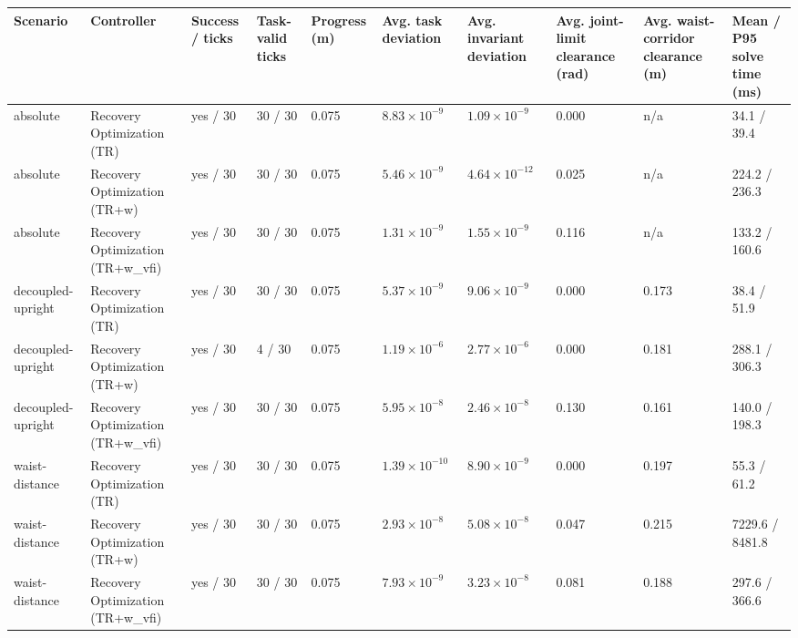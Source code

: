 \begin{tabular}{llllllllll}
\toprule
Scenario & Controller & Success / ticks & Task-valid ticks & Progress (m) & Avg. task deviation & Avg. invariant deviation & Avg. joint-limit clearance (rad) & Avg. waist-corridor clearance (m) & Mean / P95 solve time (ms) \\
\midrule
absolute & Recovery Optimization (TR) & yes / 30 & 30 / 30 & 0.075 & $8.83\times 10^{-9}$ & $1.09\times 10^{-9}$ & 0.000 & n/a & 34.1 / 39.4 \\
absolute & Recovery Optimization (TR+w) & yes / 30 & 30 / 30 & 0.075 & $5.46\times 10^{-9}$ & $4.64\times 10^{-12}$ & 0.025 & n/a & 224.2 / 236.3 \\
absolute & Recovery Optimization (TR+w\_vfi) & yes / 30 & 30 / 30 & 0.075 & $1.31\times 10^{-9}$ & $1.55\times 10^{-9}$ & 0.116 & n/a & 133.2 / 160.6 \\
decoupled-upright & Recovery Optimization (TR) & yes / 30 & 30 / 30 & 0.075 & $5.37\times 10^{-9}$ & $9.06\times 10^{-9}$ & 0.000 & 0.173 & 38.4 / 51.9 \\
decoupled-upright & Recovery Optimization (TR+w) & yes / 30 & 4 / 30 & 0.075 & $1.19\times 10^{-6}$ & $2.77\times 10^{-6}$ & 0.000 & 0.181 & 288.1 / 306.3 \\
decoupled-upright & Recovery Optimization (TR+w\_vfi) & yes / 30 & 30 / 30 & 0.075 & $5.95\times 10^{-8}$ & $2.46\times 10^{-8}$ & 0.130 & 0.161 & 140.0 / 198.3 \\
waist-distance & Recovery Optimization (TR) & yes / 30 & 30 / 30 & 0.075 & $1.39\times 10^{-10}$ & $8.90\times 10^{-9}$ & 0.000 & 0.197 & 55.3 / 61.2 \\
waist-distance & Recovery Optimization (TR+w) & yes / 30 & 30 / 30 & 0.075 & $2.93\times 10^{-8}$ & $5.08\times 10^{-8}$ & 0.047 & 0.215 & 7229.6 / 8481.8 \\
waist-distance & Recovery Optimization (TR+w\_vfi) & yes / 30 & 30 / 30 & 0.075 & $7.93\times 10^{-9}$ & $3.23\times 10^{-8}$ & 0.081 & 0.188 & 297.6 / 366.6 \\
\bottomrule
\end{tabular}
